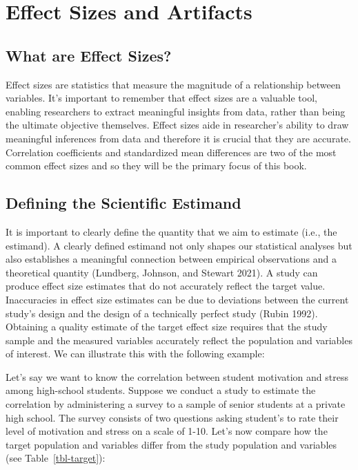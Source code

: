 \documentclass[
  letterpaper,
  DIV=11,
  numbers=noendperiod]{scrreprt}
\begin{document}

\hypertarget{effect-sizes-and-artifacts}{%
\chapter{Effect Sizes and Artifacts}\label{effect-sizes-and-artifacts}}

\hypertarget{what-are-effect-sizes}{%
\section{What are Effect Sizes?}\label{what-are-effect-sizes}}

Effect sizes are statistics that measure the magnitude of a relationship
between variables. It's important to remember that effect sizes are a
valuable tool, enabling researchers to extract meaningful insights from
data, rather than being the ultimate objective themselves. Effect sizes
aide in researcher's ability to draw meaningful inferences from data and
therefore it is crucial that they are accurate. Correlation coefficients
and standardized mean differences are two of the most common effect
sizes and so they will be the primary focus of this book.

\hypertarget{defining-the-scientific-estimand}{%
\section{Defining the Scientific
Estimand}\label{defining-the-scientific-estimand}}

It is important to clearly define the quantity that we aim to estimate
(i.e., the estimand). A clearly defined estimand not only shapes our
statistical analyses but also establishes a meaningful connection
between empirical observations and a theoretical quantity (Lundberg,
Johnson, and Stewart 2021). A study can produce effect size estimates
that do not accurately reflect the target value. Inaccuracies in effect
size estimates can be due to deviations between the current study's
design and the design of a technically perfect study (Rubin 1992).
Obtaining a quality estimate of the target effect size requires that the
study sample and the measured variables accurately reflect the
population and variables of interest. We can illustrate this with the
following example:

Let's say we want to know the correlation between student motivation and
stress among high-school students. Suppose we conduct a study to
estimate the correlation by administering a survey to a sample of senior
students at a private high school. The survey consists of two questions
asking student's to rate their level of motivation and stress on a scale
of 1-10. Let's now compare how the target population and variables
differ from the study population and variables (see
Table~\ref{tbl-target}):
\end{document}
